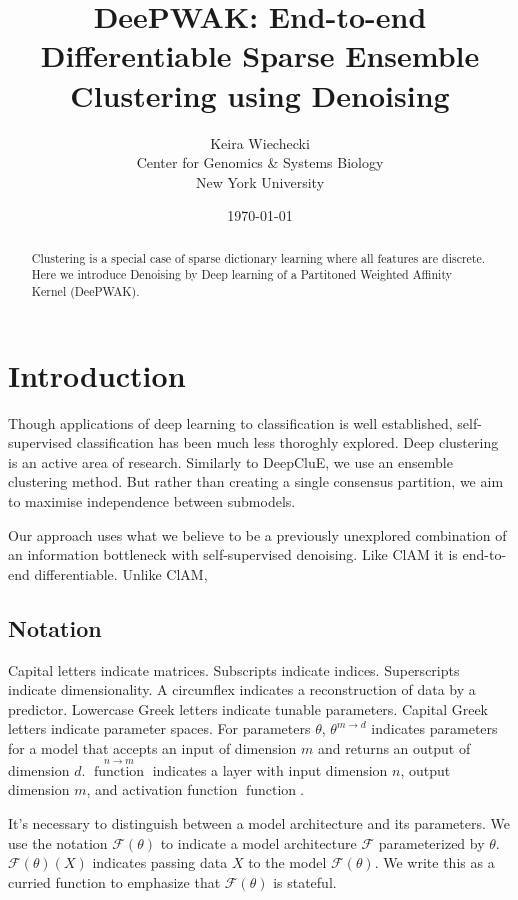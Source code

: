 \documentclass{article}
\date{\today}
\title{DeePWAK: End-to-end Differentiable Sparse Ensemble Clustering using Denoising}
\author{Keira Wiechecki \\
  Center for Genomics \& Systems Biology \\
  New York University \\
}
\newcommand{\txtop}[1]{\mathop{\mathrm{#1}}\limits}
\newcommand{\function}{\txtop{function}}
\begin{document}
\maketitle

\begin{abstract}
  Clustering is a special case of sparse dictionary learning where all features are discrete.
Here we introduce Denoising by Deep learning of a Partitoned Weighted Affinity Kernel (DeePWAK). 
\end{abstract}

\section{Introduction}
Though applications of deep learning to classification is well established, self-supervised classification has been much less thoroghly explored.
Deep clustering is an active area of research\cite{ren2022deep}.
Similarly to DeepCluE\cite{huang2023deepclue}, we use an ensemble clustering method.
But rather than creating a single consensus partition, we aim to maximise independence between submodels.

Our approach uses what we believe to be a previously unexplored combination of an information bottleneck with self-supervised denoising.
Like ClAM\cite{saha2023endtoend} it is end-to-end differentiable.
Unlike ClAM,

\subsection{Notation}
Capital letters indicate matrices. Subscripts indicate indices. Superscripts indicate dimensionality.
A circumflex indicates a reconstruction of data by a predictor. Lowercase Greek letters indicate tunable parameters.
Capital Greek letters indicate parameter spaces.
For parameters $\theta$, $\theta^{m \to d}$ indicates parameters for a model that accepts an input of dimension $m$ and returns an output of dimension $d$.
$\function^{n \to m}$ indicates a layer with input dimension $n$, output dimension $m$, and activation function $\function$.

It's necessary to distinguish between a model architecture and its parameters.
We use the notation $\mathcal{F}(\theta)$ to indicate a model architecture $\mathcal{F}$ parameterized by $\theta$.
$\mathcal{F}(\theta)(X)$ indicates passing data $X$ to the model $\mathcal{F}(\theta)$.
We write this as a curried function to emphasize that $\mathcal{F}(\theta)$ is stateful.
\end{document}
